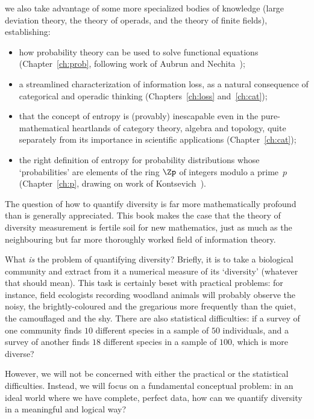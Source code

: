 we also take advantage of some more specialized bodies of knowledge (large
deviation theory, the theory of operads, and the theory of finite fields),
establishing:
% 
\begin{itemize}
\item
how probability theory can be used to solve functional equations
(Chapter~\ref{ch:prob}, following work of Aubrun and Nechita~\cite{AuNe});  

\item
a streamlined characterization of information loss, as a natural consequence
of categorical and operadic thinking (Chapters~\ref{ch:loss} and~\ref{ch:cat});

\item
that the concept of entropy is (provably) inescapable even in the
pure-mathematical heartlands of category theory, algebra and topology,
quite separately from its importance in scientific
applications (Chapter~\ref{ch:cat});

\item
the right definition of entropy for probability distributions whose
`probabilities' are elements of the ring $\Zp$ of integers modulo a
prime~$p$ (Chapter~\ref{ch:p}, drawing on work of
Kontsevich~\cite{KontOHL}). 
\end{itemize}
% 
The question of how to quantify diversity is far more mathematically
profound than is generally appreciated.  This book makes the case that the
theory of diversity measurement is fertile soil for new
mathematics, just as much as the neighbouring but far more thoroughly
worked field of information theory.

\introbreak

What \emph{is} the problem of quantifying diversity?%
% 
%
% 
Briefly, it is to take a biological community and extract from it a
numerical measure of its `diversity' (whatever that should mean).
% 
This task is certainly beset with practical problems: for instance, field
ecologists recording woodland animals will probably observe the noisy, the
brightly-coloured and the gregarious more frequently than the quiet, the
camouflaged and the shy.  There are also statistical difficulties: if a
survey of one community finds $10$ different species in a sample of $50$
individuals, and a survey of another finds $18$ different species in a
sample of $100$, which is more diverse?

However, we will not be concerned with either the practical or the
statistical difficulties.  Instead, we will focus on a fundamental
conceptual problem: in an ideal world where we have complete, perfect data,
how can we quantify diversity in a meaningful and logical way?

